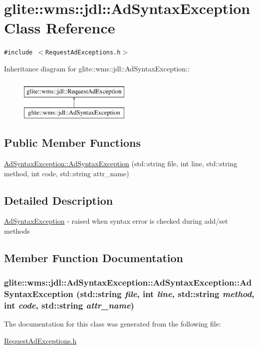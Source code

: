 \hypertarget{classglite_1_1wms_1_1jdl_1_1AdSyntaxException}{
\section{glite::wms::jdl::Ad\-Syntax\-Exception Class Reference}
\label{classglite_1_1wms_1_1jdl_1_1AdSyntaxException}
}
{\tt \#include $<$Request\-Ad\-Exceptions.h$>$}

Inheritance diagram for glite::wms::jdl::Ad\-Syntax\-Exception::\begin{figure}[H]
\begin{center}
\leavevmode
\includegraphics[height=2cm]{classglite_1_1wms_1_1jdl_1_1AdSyntaxException}
\end{center}
\end{figure}
\subsection*{Public Member Functions}
\begin{CompactItemize}
\item 
\hyperlink{classglite_1_1wms_1_1jdl_1_1AdSyntaxException_a0}{Ad\-Syntax\-Exception::Ad\-Syntax\-Exception} (std::string file, int line, std::string method, int code, std::string attr\_\-name)
\end{CompactItemize}


\subsection{Detailed Description}
\hyperlink{classglite_1_1wms_1_1jdl_1_1AdSyntaxException}{Ad\-Syntax\-Exception} - raised when syntax error is checked during add/set methods 



\subsection{Member Function Documentation}
\hypertarget{classglite_1_1wms_1_1jdl_1_1AdSyntaxException_a0}{
\subsubsection[AdSyntaxException::AdSyntaxException]{\setlength{\rightskip}{0pt plus 5cm}glite::wms::jdl::Ad\-Syntax\-Exception::Ad\-Syntax\-Exception::Ad\-Syntax\-Exception (std::string {\em file}, int {\em line}, std::string {\em method}, int {\em code}, std::string {\em attr\_\-name})}}
\label{classglite_1_1wms_1_1jdl_1_1AdSyntaxException_a0}




The documentation for this class was generated from the following file:\begin{CompactItemize}
\item 
\hyperlink{RequestAdExceptions_8h}{Request\-Ad\-Exceptions.h}\end{CompactItemize}
